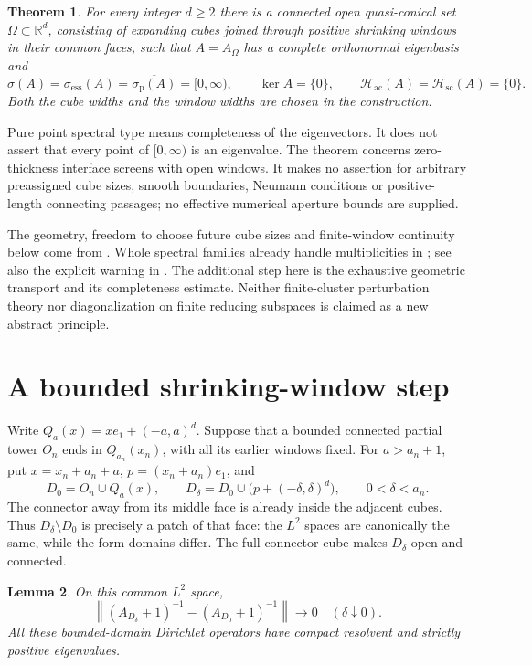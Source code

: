 \documentclass[11pt]{article}
\newtheorem{theorem}{Theorem}
\newtheorem{lemma}[theorem]{Lemma}
\newcommand{\R}{\mathbb R}
\newcommand{\norm}[1]{\left\lVert #1\right\rVert}
\begin{document}
\begin{theorem}\label{thm:main}
For every integer $d\ge2$ there is a connected open quasi-conical set
$\Omega\subset\R^d$, consisting of expanding cubes joined through positive
shrinking windows in their common faces, such that $A=A_\Omega$ has a
complete orthonormal eigenbasis and
\[
 \sigma(A)=\sigma_{\mathrm{ess}}(A)
   =\overline{\sigma_{\mathrm p}(A)}=[0,\infty),
 \qquad \ker A=\{0\},\qquad
 \mathcal H_{\mathrm{ac}}(A)=\mathcal H_{\mathrm{sc}}(A)=\{0\}.
\]
Both the cube widths and the window widths are chosen in the construction.
\end{theorem}

Pure point spectral type means completeness of the eigenvectors.
It does not assert that every point of $[0,\infty)$ is an eigenvalue.
The theorem concerns zero-thickness interface screens with open windows.
It makes no assertion for arbitrary preassigned cube sizes, smooth
boundaries, Neumann conditions or positive-length connecting passages;
no effective numerical aperture bounds are supplied.

The geometry, freedom to choose future cube sizes and finite-window
continuity below come from \cite[Sections~2.2 and~3]{KL}.
Whole spectral families already handle multiplicities in
\cite[Proposition~1.4]{HSS}; see also the explicit warning in
\cite[Remark~3.1]{KL}. The additional step here is the exhaustive geometric
transport and its completeness estimate. Neither finite-cluster
perturbation theory nor diagonalization on finite reducing subspaces is
claimed as a new abstract principle.

\section{A bounded shrinking-window step}

Write $Q_a(x)=xe_1+(-a,a)^d$. Suppose that a bounded connected partial
tower $O_n$ ends in $Q_{a_n}(x_n)$, with all its earlier windows fixed.
For $a>a_n+1$, put $x=x_n+a_n+a$, $p=(x_n+a_n)e_1$, and
\[
 D_0=O_n\cup Q_a(x),\qquad
 D_\delta=D_0\cup\bigl(p+(-\delta,\delta)^d\bigr),
 \qquad 0<\delta<a_n .
\]
The connector away from its middle face is already inside the adjacent
cubes. Thus $D_\delta\setminus D_0$ is precisely a patch of that face:
the $L^2$ spaces are canonically the same, while the form domains differ.
The full connector cube makes $D_\delta$ open and connected.

\begin{lemma}\label{lem:window}
On this common $L^2$ space,
\[
 \norm{(A_{D_\delta}+1)^{-1}-(A_{D_0}+1)^{-1}}\longrightarrow0
 \quad(\delta\downarrow0).
\]
All these bounded-domain Dirichlet operators have compact resolvent and
strictly positive eigenvalues.
\end{lemma}
\end{document}
